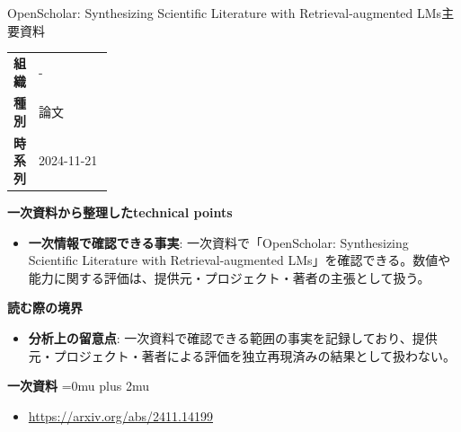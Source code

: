 \begin{technicalnote}{OpenScholar: Synthesizing Scientific Literature with Retrieval-augmented LMs}{主要資料}
\begingroup
\begin{tabularx}{\linewidth}{@{}>{\bfseries}p{0.22\linewidth}X@{}}
組織 & - \\
種別 & 論文 \\
時系列 & 2024-11-21 \\
\end{tabularx}
\smallskip
{\bfseries 一次資料から整理したtechnical points}
\begin{itemize}[leftmargin=1.5em,itemsep=0.35em]
\item \textbf{一次情報で確認できる事実}: 一次資料で「OpenScholar: Synthesizing Scientific Literature with Retrieval-augmented LMs」を確認できる。数値や能力に関する評価は、提供元・プロジェクト・著者の主張として扱う。
\end{itemize}
\begin{minipage}{\linewidth}
{\bfseries 読む際の境界}
\begin{itemize}[leftmargin=1.5em,itemsep=0.35em]
\item \textbf{分析上の留意点}: 一次資料で確認できる範囲の事実を記録しており、提供元・プロジェクト・著者による評価を独立再現済みの結果として扱わない。
\end{itemize}
\begin{samepage}
{\bfseries 一次資料}
\begingroup\sloppy
\Urlmuskip=0mu plus 2mu\relax
\begin{itemize}[leftmargin=1.5em,itemsep=0.25em]
\item {\scriptsize\url{https://arxiv.org/abs/2411.14199}}
\end{itemize}
\endgroup
\end{samepage}
\end{minipage}
\endgroup
\end{technicalnote}
\medskip

